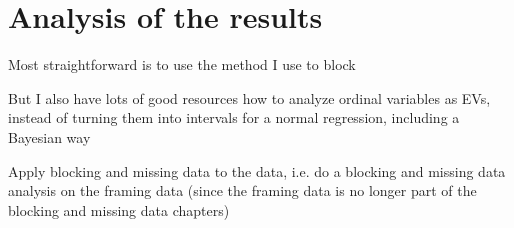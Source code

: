 \section*{Analysis of the results}
	\begin{coi}
		\item Most straightforward is to use the method I use to block
		\item But I also have lots of good resources how to analyze ordinal variables as EVs, instead of turning them into intervals for a normal regression, including a Bayesian way
		\item Apply blocking and missing data to the data, i.e. do a blocking and missing data analysis on the framing data (since the framing data is no longer part of the blocking and missing data chapters)
	\end{coi}



